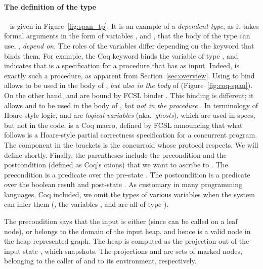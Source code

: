 \paragraph{The definition of the type}~ is given in
Figure~\ref{fig:span_tp}.
%
It is an example of a \emph{dependent type}, as it takes formal
arguments in the form of variables ,  and ,
that the body of the type can use, \ie, \emph{depend on}.  The roles of
the variables differ depending on the keyword that binds them.
%
For example, the Coq keyword  binds the variable 
of type , and indicates that  is a
specification for a procedure that has  as input. Indeed,
 is exactly such a procedure, as apparent from
Section~\ref{sec:overview}. Using  to bind 
allows  to be used in the body of , \emph{but
  also in the body} of  (Figure~\ref{fig:coq-span}).
%
On the other hand,  and  are bound by FCSL binder
. This binding is different; it allows  and
 to be used in the body of , \emph{but not in
  the procedure} . In terminology of Hoare-style logic,
 and  are \emph{logical variables}
(aka.~\emph{ghosts}), which are used in specs, but not in the code.
%
 is a Coq macro, defined by FCSL announcing that what
follows is a Hoare-style partial correctness specification for a
concurrent program. The component  in the brackets
is the concurroid whose protocol  respects. We will
define  shortly. Finally, the parentheses
include the precondition and the postcondition (defined as Coq's
ctions) that we want to ascribe to . The
precondition is a predicate over the pre-state . The
postcondition is a predicate over the boolean result  and
post-state . As customary in many programming languages, Coq
included, we omit the types of various variables when the system can
infer them (\eg, the variables ,  and  are
all of type ).

The precondition says that the input  is either 
(since  can be called on a leaf node), or belongs to the
domain of the input heap, and hence is a valid node in the
heap-represented graph. The heap is computed as the projection
 out of the input state , which 
snapshots.  The projections  and  are sets of
marked nodes, belonging to the caller of  and to its
environment, respectively.

